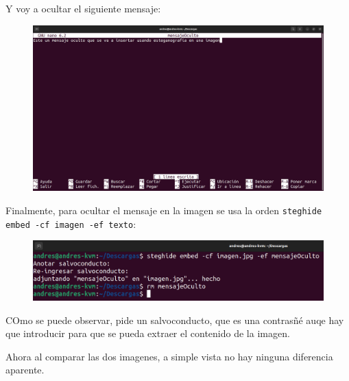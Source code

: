 \documentclass{article}
\begin{document}
Y voy a ocultar el siguiente mensaje:

\begin{figure}[H]
    \includegraphics[width=\textwidth]{imagenes/Captura desde 2022-10-30 11-27-46.png}
\end{figure}

Finalmente, para ocultar el mensaje en la imagen se usa la orden \verb|steghide embed -cf imagen -ef texto|:

\begin{figure}[H]
    \includegraphics[width=\textwidth]{imagenes/Captura desde 2022-10-30 11-30-08.png}
\end{figure}

COmo se puede observar, pide un salvoconducto, que es una contrasñé auqe hay que introducir para que se pueda extraer el contenido de la imagen.

Ahora al comparar las dos imagenes, a simple vista no hay ninguna diferencia aparente.
\end{document}
